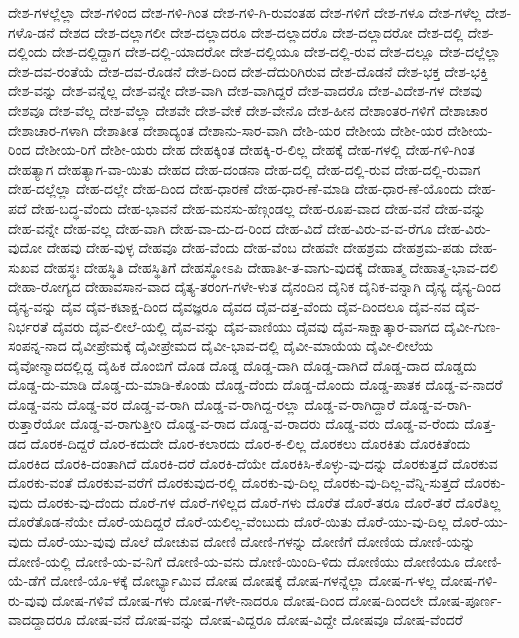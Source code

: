 {ದೇಶ-ಗಳಲ್ಲೆಲ್ಲಾ
ದೇಶ-ಗಳಿಂದ
ದೇಶ-ಗಳಿ-ಗಿಂತ
ದೇಶ-ಗಳಿ-ಗಿ-ರುವಂತಹ
ದೇಶ-ಗಳಿಗೆ
ದೇಶ-ಗಳೂ
ದೇಶ-ಗಳೆಲ್ಲ
ದೇಶ-ಗಳೊ-ಡನೆ
ದೇಶದ
ದೇಶ-ದಲ್ಲಾಗಲೀ
ದೇಶ-ದಲ್ಲಾದರೂ
ದೇಶ-ದಲ್ಲಾದರೊ
ದೇಶ-ದಲ್ಲಾದರೋ
ದೇಶ-ದಲ್ಲಿ
ದೇಶ-ದಲ್ಲಿಂದು
ದೇಶ-ದಲ್ಲಿದ್ದಾಗ
ದೇಶ-ದಲ್ಲಿ-ಯಾದರೋ
ದೇಶ-ದಲ್ಲಿಯೂ
ದೇಶ-ದಲ್ಲಿ-ರುವ
ದೇಶ-ದಲ್ಲೂ
ದೇಶ-ದಲ್ಲೆಲ್ಲಾ
ದೇಶ-ದವ-ರಂತೆಯೆ
ದೇಶ-ದವ-ರೊಡನೆ
ದೇಶ-ದಿಂದ
ದೇಶ-ದೆದುರಿಗಿರುವ
ದೇಶ-ದೊಡನೆ
ದೇಶ-ಭಕ್ತ
ದೇಶ-ಭಕ್ತಿ
ದೇಶ-ವನ್ನು
ದೇಶ-ವನ್ನೆಲ್ಲ
ದೇಶ-ವನ್ನೇ
ದೇಶ-ವಾಗಿ
ದೇಶ-ವಾಗಿದ್ದರೆ
ದೇಶ-ವಾದರೊ
ದೇಶ-ವಿದೇಶ-ಗಳ
ದೇಶವು
ದೇಶವೂ
ದೇಶ-ವೆಲ್ಲ
ದೇಶ-ವೆಲ್ಲಾ
ದೇಶವೇ
ದೇಶ-ವೇಕೆ
ದೇಶ-ವೇನೊ
ದೇಶ-ಹೀನ
ದೇಶಾಂತರ-ಗಳಿಗೆ
ದೇಶಾಚಾರ
ದೇಶಾಚಾರ-ಗಳಾಗಿ
ದೇಶಾತೀತ
ದೇಶಾದ್ಯಂತ
ದೇಶಾನು-ಸಾರ-ವಾಗಿ
ದೇಶಿ-ಯರ
ದೇಶೀಯ
ದೇಶೀ-ಯರ
ದೇಶೀಯ-ರಿಂದ
ದೇಶೀಯ-ರಿಗೆ
ದೇಶೀ-ಯರು
ದೇಹ
ದೇಹಕ್ಕಿಂತ
ದೇಹಕ್ಕಿ-ರ-ಲಿಲ್ಲ
ದೇಹಕ್ಕೆ
ದೇಹ-ಗಳಲ್ಲಿ
ದೇಹ-ಗಳಿ-ಗಿಂತ
ದೇಹತ್ಯಾಗ
ದೇಹತ್ಯಾಗ-ವಾ-ಯಿತು
ದೇಹದ
ದೇಹ-ದಂಡನಾ
ದೇಹ-ದಲ್ಲಿ
ದೇಹ-ದಲ್ಲಿ-ರುವ
ದೇಹ-ದಲ್ಲಿ-ರುವಾಗ
ದೇಹ-ದಲ್ಲೆಲ್ಲಾ
ದೇಹ-ದಲ್ಲೇ
ದೇಹ-ದಿಂದ
ದೇಹ-ಧಾರಣೆ
ದೇಹ-ಧಾರ-ಣೆ-ಮಾಡಿ
ದೇಹ-ಧಾರ-ಣೆ-ಯೊಂದು
ದೇಹ-ಪದೆ
ದೇಹ-ಬದ್ಧ-ವೆಂದು
ದೇಹ-ಭಾವನೆ
ದೇಹ-ಮನಸು-ಹೆಣ್ಗಂಡಲ್ಲ
ದೇಹ-ರೂಪ-ವಾದ
ದೇಹ-ವನೆ
ದೇಹ-ವನ್ನು
ದೇಹ-ವನ್ನೇ
ದೇಹ-ವಲ್ಲ
ದೇಹ-ವಾಗಿ
ದೇಹ-ವಾ-ದು-ದ-ರಿಂದ
ದೇಹ-ವಿದೆ
ದೇಹ-ವಿರು-ವ-ವ-ರೆಗೂ
ದೇಹ-ವಿರು-ವುದೋ
ದೇಹವು
ದೇಹ-ವುಳ್ಳ
ದೇಹವೂ
ದೇಹ-ವೆಂದು
ದೇಹ-ವೆಂಬ
ದೇಹವೇ
ದೇಹಶ್ರಮ
ದೇಹಶ್ರಮ-ಪಡು
ದೇಹ-ಸುಖವ
ದೇಹಸ್ಥಃ
ದೇಹಸ್ಥಿತಿ
ದೇಹಸ್ಥಿತಿಗೆ
ದೇಹಸ್ಥೋಽಪಿ
ದೇಹಾತೀ-ತ-ವಾಗು-ವುದಕ್ಕೆ
ದೇಹಾತ್ಮ
ದೇಹಾತ್ಮ-ಭಾವ-ದಲಿ
ದೇಹಾ-ರೋಗ್ಯದ
ದೇಹಾವಸಾನ-ವಾದ
ದೈತ್ಯ-ತರಂಗ-ಗಳೇ-ಳುತ
ದೈನಂದಿನ
ದೈನಿಕ
ದೈನಿಕ-ವನ್ನಾಗಿ
ದೈನ್ಯ
ದೈನ್ಯ-ದಿಂದ
ದೈನ್ಯ-ವನ್ನು
ದೈವ
ದೈವ-ಕಟಾಕ್ಷ-ದಿಂದ
ದೈವಜ್ಞರೂ
ದೈವದ
ದೈವ-ದತ್ತ-ವೆಂದು
ದೈವ-ದಿಂದಲೂ
ದೈವ-ನವ
ದೈವ-ನಿರ್ಭರತೆ
ದೈವರು
ದೈವ-ಲೀಲೆ-ಯಲ್ಲಿ
ದೈವ-ವನ್ನು
ದೈವ-ವಾಣಿಯು
ದೈವವು
ದೈವ-ಸಾಕ್ಷಾತ್ಕಾರ-ವಾಗದ
ದೈವೀ-ಗುಣ-ಸಂಪನ್ನ-ನಾದ
ದೈವೀಪ್ರೇಮಕ್ಕೆ
ದೈವೀಪ್ರೇಮದ
ದೈವೀ-ಭಾವ-ದಲ್ಲಿ
ದೈವೀ-ಮಾಯೆಯ
ದೈವೀ-ಲೀಲೆಯ
ದೈವೋನ್ಮಾದದಲ್ಲಿದ್ದ
ದೈಹಿಕ
ದೊಂಬಿಗೆ
ದೊಡ
ದೊಡ್ಡ
ದೊಡ್ಡ-ದಾಗಿ
ದೊಡ್ಡ-ದಾಗಿದೆ
ದೊಡ್ಡ-ದಾದ
ದೊಡ್ಡದು
ದೊಡ್ಡ-ದು-ಮಾಡಿ
ದೊಡ್ಡ-ದು-ಮಾಡಿ-ಕೊಂಡು
ದೊಡ್ಡ-ದೆಂದು
ದೊಡ್ಡ-ದೊಂದು
ದೊಡ್ಡ-ಪಾತಕ
ದೊಡ್ಡ-ವ-ನಾದರೆ
ದೊಡ್ಡ-ವನು
ದೊಡ್ಡ-ವರ
ದೊಡ್ಡ-ವ-ರಾಗಿ
ದೊಡ್ಡ-ವ-ರಾಗಿದ್ದ-ರಲ್ಲಾ
ದೊಡ್ಡ-ವ-ರಾಗಿದ್ದಾರೆ
ದೊಡ್ಡ-ವ-ರಾಗಿ-ರುತ್ತಾರೆಯೋ
ದೊಡ್ಡ-ವ-ರಾಗುತ್ತೀರಿ
ದೊಡ್ಡ-ವ-ರಾದ
ದೊಡ್ಡ-ವ-ರಾದರು
ದೊಡ್ಡ-ವರು
ದೊಡ್ಡ-ವ-ರೆಂದು
ದೊತ್ತ-ಡದ
ದೊರಕ-ದಿದ್ದರೆ
ದೊರ-ಕದುದೇ
ದೊರ-ಕಲಾರದು
ದೊರ-ಕ-ಲಿಲ್ಲ
ದೊರಕಲು
ದೊರಕಿತು
ದೊರಕಿತೆಂದು
ದೊರಕಿದ
ದೊರಕಿ-ದಂತಾಗಿದೆ
ದೊರಕಿ-ದರೆ
ದೊರಕಿ-ದೆಯೇ
ದೊರಕಿಸಿ-ಕೊಳ್ಳು-ವು-ದನ್ನು
ದೊರಕುತ್ತದೆ
ದೊರಕುವ
ದೊರಕು-ವಂತೆ
ದೊರಕುವ-ವರೆಗೆ
ದೊರಕುವುದ-ರಲ್ಲಿ
ದೊರಕು-ವು-ದಿಲ್ಲ
ದೊರಕು-ವು-ದಿಲ್ಲ-ವೆನ್ನಿ-ಸುತ್ತದೆ
ದೊರಕು-ವುದು
ದೊರಕು-ವು-ದೆಂದು
ದೊರೆ-ಗಳ
ದೊರೆ-ಗಳಿಲ್ಲದ
ದೊರೆ-ಗಳು
ದೊರೆತ
ದೊರೆ-ತರೂ
ದೊರೆ-ತರೆ
ದೊರೆತಿಲ್ಲ
ದೊರೆತೊಡ-ನೆಯೇ
ದೊರೆ-ಯದಿದ್ದರೆ
ದೊರೆ-ಯಲಿಲ್ಲ-ವೆಂಬುದು
ದೊರೆ-ಯಿತು
ದೊರೆ-ಯು-ವು-ದಿಲ್ಲ
ದೊರೆ-ಯು-ವುದು
ದೊರೆ-ಯು-ವುವು
ದೊಲೆ
ದೋಚುವ
ದೋಣಿ
ದೋಣಿ-ಗಳನ್ನು
ದೋಣಿಗೆ
ದೋಣಿಯ
ದೋಣಿ-ಯನ್ನು
ದೋಣಿ-ಯಲ್ಲಿ
ದೋಣಿ-ಯ-ವ-ನಿಗೆ
ದೋಣಿ-ಯ-ವನು
ದೋಣಿ-ಯಿಂದಿ-ಳಿದು
ದೋಣಿಯು
ದೋಣಿಯೂ
ದೋಣಿ-ಯೆ-ಡೆಗೆ
ದೋಣಿ-ಯೊ-ಳಕ್ಕೆ
ದೋರ್ಭ್ಯಾಮಿವ
ದೋಷ
ದೋಷಕ್ಕೆ
ದೋಷ-ಗಳನ್ನೆಲ್ಲಾ
ದೋಷ-ಗ-ಳಲ್ಲ
ದೋಷ-ಗಳಿ-ರು-ವುವು
ದೋಷ-ಗಳಿವೆ
ದೋಷ-ಗಳು
ದೋಷ-ಗಳೇ-ನಾದರೂ
ದೋಷ-ದಿಂದ
ದೋಷ-ದಿಂದಲೇ
ದೋಷ-ಪೂರ್ಣ-ವಾದದ್ದಾದರೂ
ದೋಷ-ವನೆ
ದೋಷ-ವನ್ನು
ದೋಷ-ವಿದ್ದರೂ
ದೋಷ-ವಿದ್ದೇ
ದೋಷವೂ
ದೋಷ-ವೆಂದರೆ
}
